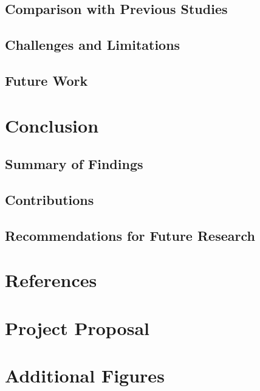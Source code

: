 \documentclass[11pt]{article}
\begin{document}
  \subsection{Comparison with Previous Studies}
  \subsection{Challenges and Limitations}
  \subsection{Future Work}

\section{Conclusion}
\subsection{Summary of Findings}

\subsection{Contributions}

\subsection{Recommendations for Future Research}

\section{References}



\appendix
\section{Project Proposal}

\section{Additional Figures}
\end{document}
